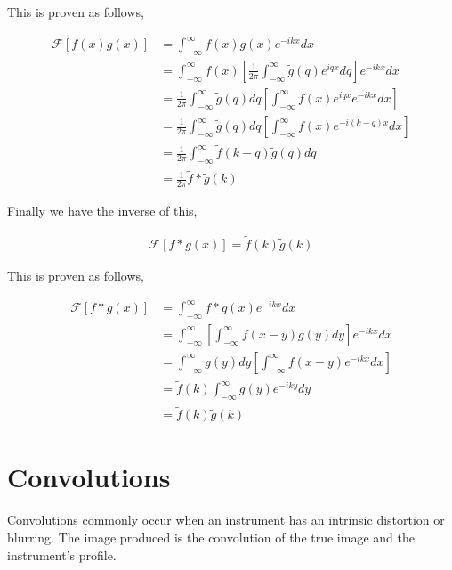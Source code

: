 \documentclass[11pt]{amsart}
\begin{document}
This is proven as follows,

\begin{align*}
  \mathcal{F}\left[f(x)g(x)\right] &= \int_{-\infty}^{\infty}f(x)g(x)e^{-ikx}dx \\
                                   &= \int_{-\infty}^{\infty}f(x) \left[\frac{1}{2\pi} \int_{-\infty}^{\infty} \tilde{g}(q) e^{iqx} dq\right] e^{-ikx} dx \\
                                   &= \frac{1}{2\pi} \int_{-\infty}^{\infty} \tilde{g}(q) dq \left[\int_{-\infty}^{\infty}f(x) e^{iqx}e^{-ikx} dx\right] \\
                                   &= \frac{1}{2\pi} \int_{-\infty}^{\infty} \tilde{g}(q) dq \left[\int_{-\infty}^{\infty}f(x) e^{-i(k - q)x} dx\right] \\
                                   &= \frac{1}{2\pi} \int_{-\infty}^{\infty} \tilde{f}(k-q) \tilde{g}(q) dq \\
                                   &= \frac{1}{2\pi} \tilde{f}*\tilde{g}(k)
\end{align*}

Finally we have the inverse of this,

\begin{align*}
  \mathcal{F}\left[f*g(x)\right] = \tilde{f}(k) \tilde{g}(k)
\end{align*}

This is proven as follows,

\begin{align*}
  \mathcal{F}\left[f*g(x)\right] &= \int_{-\infty}^{\infty} f*g(x) e^{-ikx} dx \\
                                 &= \int_{-\infty}^{\infty} \left[\int_{-\infty}^{\infty}f(x-y)g(y)dy\right] e^{-ikx} dx \\
                                 &= \int_{-\infty}^{\infty} g(y) dy \left[\int_{-\infty}^{\infty} f(x-y) e^{-ikx} dx\right] \\
                                 &= \tilde{f}(k) \int_{-\infty}^{\infty} g(y) e^{-iky} dy \\
                                 &= \tilde{f}(k) \tilde{g}(k)
\end{align*}


\section{Convolutions}

Convolutions commonly occur when an instrument has an intrinsic distortion or blurring. The image produced is the convolution of the true image and the instrument's profile.
\end{document}
